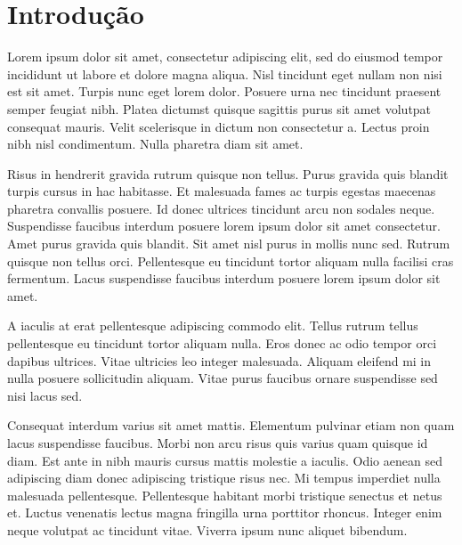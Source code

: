 
\chapter*[Introdução]{Introdução}

Lorem ipsum dolor sit amet, consectetur adipiscing elit, sed do eiusmod tempor incididunt
ut labore et dolore magna aliqua. Nisl tincidunt eget nullam non nisi est sit amet. Turpis
nunc eget lorem dolor. Posuere urna nec tincidunt praesent semper feugiat nibh. Platea
dictumst quisque sagittis purus sit amet volutpat consequat mauris. Velit scelerisque in
dictum non consectetur a. Lectus proin nibh nisl condimentum. Nulla pharetra diam sit amet.

Risus in hendrerit gravida rutrum quisque non tellus. Purus gravida quis blandit turpis cursus
in hac habitasse. Et malesuada fames ac turpis egestas maecenas pharetra convallis posuere.
Id donec ultrices tincidunt arcu non sodales neque. Suspendisse faucibus interdum posuere lorem
ipsum dolor sit amet consectetur. Amet purus gravida quis blandit. Sit amet nisl purus in mollis
nunc sed. Rutrum quisque non tellus orci. Pellentesque eu tincidunt tortor aliquam nulla
facilisi cras fermentum. Lacus suspendisse faucibus interdum posuere lorem ipsum dolor sit amet.

A iaculis at erat pellentesque adipiscing commodo elit. Tellus rutrum tellus pellentesque eu
tincidunt tortor aliquam nulla. Eros donec ac odio tempor orci dapibus ultrices. Vitae ultricies
leo integer malesuada. Aliquam eleifend mi in nulla posuere sollicitudin aliquam. Vitae purus
faucibus ornare suspendisse sed nisi lacus sed.

Consequat interdum varius sit amet mattis. Elementum pulvinar etiam non quam lacus suspendisse
faucibus. Morbi non arcu risus quis varius quam quisque id diam. Est ante in nibh mauris cursus
mattis molestie a iaculis. Odio aenean sed adipiscing diam donec adipiscing tristique risus nec.
Mi tempus imperdiet nulla malesuada pellentesque. Pellentesque habitant morbi tristique senectus
et netus et. Luctus venenatis lectus magna fringilla urna porttitor rhoncus. Integer enim neque
volutpat ac tincidunt vitae. Viverra ipsum nunc aliquet bibendum.